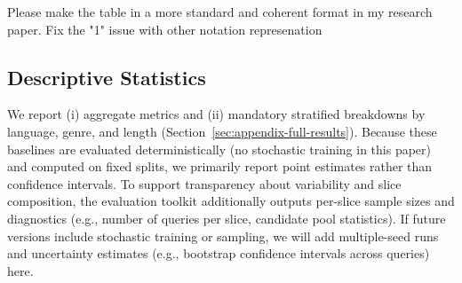 \documentclass[11pt]{article}
\begin{document}
Please make the table in a more standard and coherent format in my research paper.
Fix the "1" issue with other notation represenation

\subsection{Descriptive Statistics}
\label{sec:checklist-c3}
We report (i) aggregate metrics and (ii) mandatory stratified breakdowns by language, genre, and length (Section~\ref{sec:appendix-full-results}).
Because these baselines are evaluated deterministically (no stochastic training in this paper) and computed on fixed splits, we primarily report point estimates rather than confidence intervals.
To support transparency about variability and slice composition, the evaluation toolkit additionally outputs per-slice sample sizes and diagnostics (e.g., number of queries per slice, candidate pool statistics).
If future versions include stochastic training or sampling, we will add multiple-seed runs and uncertainty estimates (e.g., bootstrap confidence intervals across queries) here.
\end{document}
